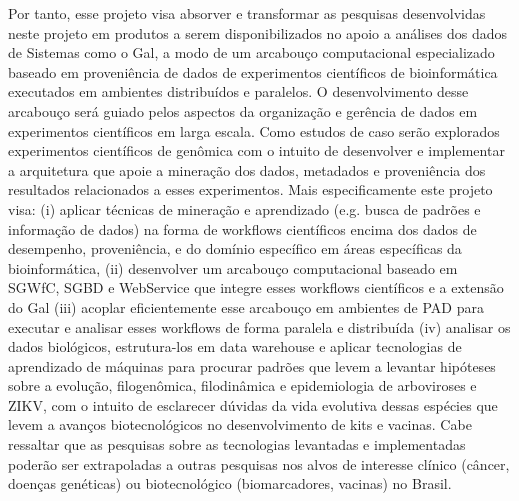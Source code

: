 Por tanto, esse projeto visa absorver e transformar as pesquisas desenvolvidas neste projeto em produtos a serem disponibilizados no apoio a análises dos dados de Sistemas como o Gal, a modo de um arcabouço computacional especializado baseado em proveniência de dados de experimentos científicos de bioinformática executados em ambientes distribuídos e paralelos. O desenvolvimento desse arcabouço será guiado pelos aspectos da organização e gerência de dados em experimentos científicos em larga escala. Como estudos de caso serão explorados experimentos científicos de genômica com o intuito de desenvolver e implementar a arquitetura que apoie a mineração dos dados, metadados e proveniência dos resultados relacionados a esses experimentos. Mais especificamente este projeto visa: (i) aplicar técnicas de mineração e aprendizado (e.g. busca de padrões e informação de dados) na forma de workflows científicos encima dos dados de desempenho, proveniência, e do domínio específico em áreas específicas da bioinformática, (ii) desenvolver um arcabouço computacional baseado em SGWfC, SGBD e WebService que integre esses workflows científicos e a extensão do Gal (iii) acoplar eficientemente esse arcabouço em ambientes de PAD para executar e analisar esses workflows de forma paralela e distribuída (iv) analisar os dados biológicos, estrutura-los em data warehouse e aplicar tecnologias de aprendizado de máquinas para procurar padrões que levem a levantar hipóteses sobre a evolução, filogenômica, filodinâmica e epidemiologia de arboviroses e ZIKV, com o intuito de esclarecer dúvidas da vida evolutiva dessas espécies que levem a avanços biotecnológicos no desenvolvimento de kits e vacinas. Cabe ressaltar que as pesquisas sobre as tecnologias levantadas e implementadas poderão ser extrapoladas a outras pesquisas nos alvos de interesse clínico (câncer, doenças genéticas) ou biotecnológico (biomarcadores, vacinas) no Brasil.
